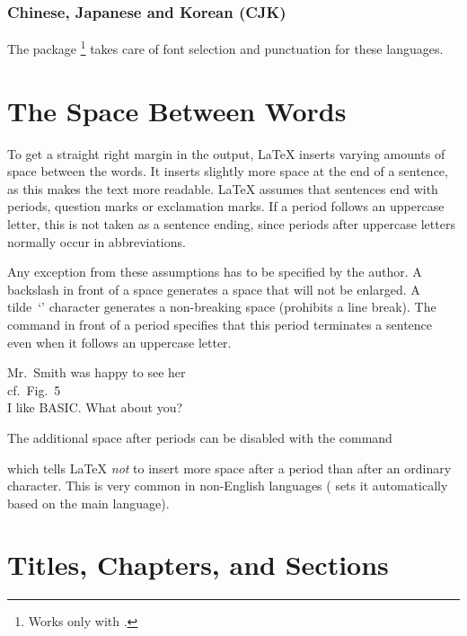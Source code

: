 \subsubsection{Chinese, Japanese and Korean (CJK)}%

The package \footnote{Works only with
  .} takes care of font selection and
punctuation for these languages.

\section{The Space Between Words}

To get a straight right margin in the output, \LaTeX{} inserts varying
amounts of space between the words. It inserts slightly more space at
the end of a sentence, as this makes the text more readable.  \LaTeX{}
assumes that sentences end with periods, question marks or exclamation
marks. If a period follows an uppercase letter, this is not taken as a
sentence ending, since periods after uppercase letters normally occur in
abbreviations.

Any exception from these assumptions has to be specified by the author. A
backslash in front of a space generates a space that will not be enlarged. A
tilde~\enquote*{\ai{\~}} character generates a non-breaking space (prohibits a
line break). The command  in front of a period specifies that this
period terminates a sentence even when it follows an uppercase letter.

\begin{example}
Mr.~Smith was happy to see her\\
cf.~Fig.~5\\
I like BASIC\@. What about you?
\end{example}

The additional space after periods can be disabled with the command
\begin{lscommand}
\end{lscommand}
which tells \LaTeX{} \emph{not} to insert more space after a period than after
an ordinary character. This is very common in non-English languages
( sets it automatically based on the main language).

\section{Titles, Chapters, and Sections}

